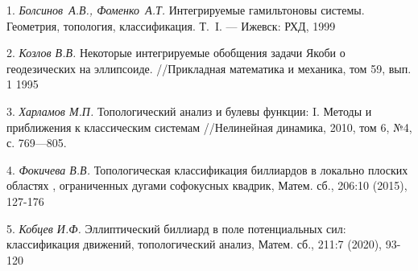 \litlist

1. {\it Болсинов~А.В.,  Фоменко~А.Т. } Интегрируемые гамильтоновы системы.  Геометрия, топология, классификация.
Т.~{I}. --- Ижевск: РХД, 1999
\par 2. {\it  Козлов В.В. } Некоторые интегрируемые обобщения задачи Якоби о геодезических на эллипсоиде. //Прикладная математика и механика, том 59, вып. 1 1995
\par 3. {\it  Харламов М.П. } Топологический анализ и булевы функции: {I}. Методы и приближения к классическим системам //Нелинейная динамика, 2010, том 6, №4, с. 769---805.
\par 4. {\it  Фокичева В.В.  } Топологическая классификация биллиардов в локально плоских областях , ограниченных дугами софокусных квадрик, Матем. сб., 206:10 (2015), 127-176
\par 5. {\it Кобцев И.Ф.  } Эллиптический биллиард в поле потенциальных сил: классификация движений, топологический анализ, Матем. сб., 211:7 (2020), 93-120


